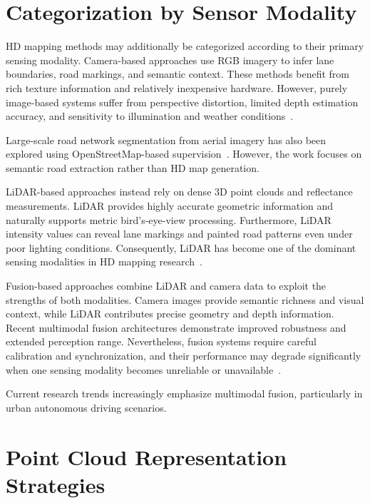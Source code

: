 \section{Categorization by Sensor Modality}
\label{sec:sensor_modality}

HD mapping methods may additionally be categorized according to their primary sensing modality. Camera-based approaches use RGB imagery to infer lane boundaries, road markings, and semantic context. These methods benefit from rich texture information and relatively inexpensive hardware. However, purely image-based systems suffer from perspective distortion, limited depth estimation accuracy, and sensitivity to illumination and weather conditions~\cite{li2022bevformerlearningbirdseyeviewrepresentation}.

Large-scale road network segmentation from aerial imagery has also been explored using OpenStreetMap-based supervision~\cite{ParsingAerialImagesAroundtheWorld}. However, the work focuses on semantic road extraction rather than HD map generation.

LiDAR-based approaches instead rely on dense 3D point clouds and reflectance measurements. LiDAR provides highly accurate geometric information and naturally supports metric bird’s-eye-view processing. Furthermore, LiDAR intensity values can reveal lane markings and painted road patterns even under poor lighting conditions. Consequently, LiDAR has become one of the dominant sensing modalities in HD mapping research~\cite{gong2024lidarbasedhdmaplocalization}.

Fusion-based approaches combine LiDAR and camera data to exploit the strengths of both modalities. Camera images provide semantic richness and visual context, while LiDAR contributes precise geometry and depth information. Recent multimodal fusion architectures demonstrate improved robustness and extended perception range. Nevertheless, fusion systems require careful calibration and synchronization, and their performance may degrade significantly when one sensing modality becomes unreliable or unavailable~\cite{HDMapFusion}.

Current research trends increasingly emphasize multimodal fusion, particularly in urban autonomous driving scenarios.

\section{Point Cloud Representation Strategies}
\label{sec:point_cloud_repr}

